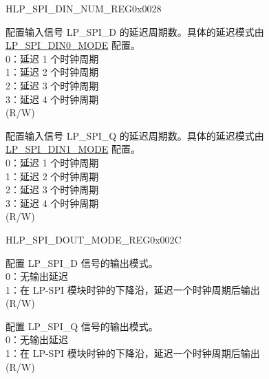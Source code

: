 \begin{register}{H}{LP\_SPI\_DIN\_NUM\_REG}{0x0028}\label{regdesc:LPSPIDINNUMREG}
%
%
%
%
%
\regnewline%
\begin{regdesc}\begin{reglist}
\label{fielddesc:LPSPIDIN0NUM}\item [LP\_SPI\_DIN0\_NUM] 配置输入信号 LP\_SPI\_D 的延迟周期数。具体的延迟模式由 \hyperref[fielddesc:LPSPIDIN0MODE]{LP\_SPI\_DIN0\_MODE} 配置。\\
0：延迟 1 个时钟周期\\
1：延迟 2 个时钟周期\\
2：延迟 3 个时钟周期\\
3：延迟 4 个时钟周期\\

(R/W)
\label{fielddesc:LPSPIDIN1NUM}\item [LP\_SPI\_DIN1\_NUM] 配置输入信号 LP\_SPI\_Q 的延迟周期数。具体的延迟模式由 \hyperref[fielddesc:LPSPIDIN1MODE]{LP\_SPI\_DIN1\_MODE} 配置。\\
0：延迟 1 个时钟周期\\
1：延迟 2 个时钟周期\\
2：延迟 3 个时钟周期\\
3：延迟 4 个时钟周期\\

(R/W)
\end{reglist}\end{regdesc}
\end{register}


\begin{register}{H}{LP\_SPI\_DOUT\_MODE\_REG}{0x002C}\label{regdesc:LPSPIDOUTMODEREG}
%
%
%
%
%
\regnewline%
\begin{regdesc}\begin{reglist}
\label{fielddesc:LPSPIDOUT0MODE}\item [LP\_SPI\_DOUT0\_MODE] 配置 LP\_SPI\_D 信号的输出模式。\\
0：无输出延迟\\
1：在 LP-SPI 模块时钟的下降沿，延迟一个时钟周期后输出\\
(R/W)
\label{fielddesc:LPSPIDOUT1MODE}\item [LP\_SPI\_DOUT1\_MODE] 配置 LP\_SPI\_Q 信号的输出模式。\\
0：无输出延迟\\
1：在 LP-SPI 模块时钟的下降沿，延迟一个时钟周期后输出\\
(R/W)
\end{reglist}\end{regdesc}
\end{register}


